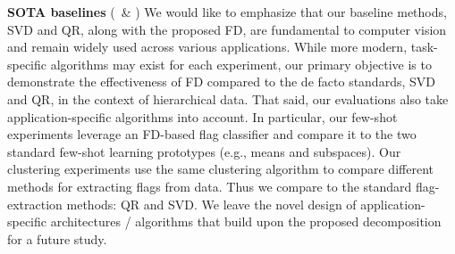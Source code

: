 \documentclass[10pt,twocolumn,letterpaper]{article}
\begin{document}
\noindent \textbf{SOTA baselines} (\Rone~\& \Rfour) 
We would like to emphasize that our baseline methods, SVD and QR, along with the proposed FD, are fundamental to computer vision and remain widely used across various applications. While more modern, task-specific algorithms may exist for each experiment, our primary objective is to demonstrate the effectiveness of FD compared to the de facto standards, SVD and QR, in the context of hierarchical data. That said, our evaluations also take application-specific algorithms into account. In particular, our few-shot experiments leverage an FD-based flag classifier and compare it to the two standard few-shot learning prototypes (e.g., means and subspaces). Our clustering experiments use the same clustering algorithm to compare different methods for extracting flags from data. Thus we compare to the standard flag-extraction methods: QR and SVD. We leave the novel design of application-specific architectures / algorithms that build upon the proposed decomposition for a future study.
\end{document}
